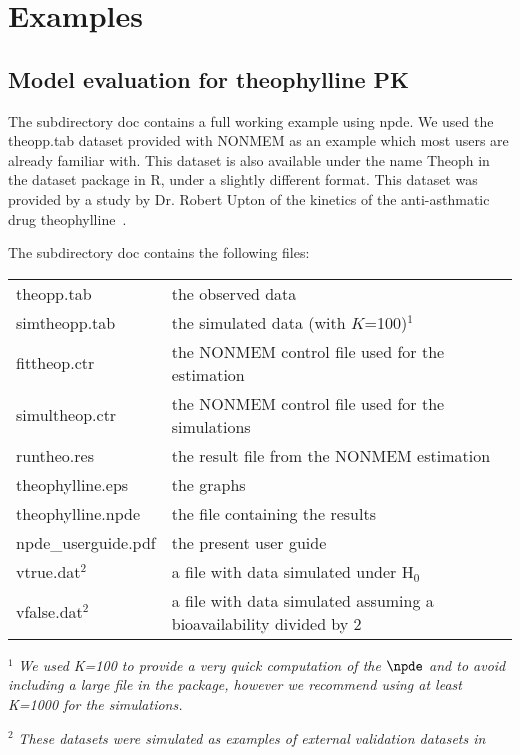 \section{Examples} \label{sec:npde.examples}

\subsection{Model evaluation for theophylline PK} \label{sec:exampletheo}

\hskip 18pt The subdirectory {\sf doc} contains a full working example using {\sf npde}. We used the {\sf theopp.tab} dataset provided with {\sf NONMEM} as an example which most users are already familiar with. This dataset is also available under the name {\sf Theoph} in the {\sf dataset} package in {\sf R}, under a slightly different format. This dataset was provided by a study by Dr. Robert Upton of the kinetics of the anti-asthmatic drug theophylline~\cite{NONMEM}.

The subdirectory {\sf doc} contains the following files:
\begin{center}
\begin{tabular} {l l}
\hline
theopp.tab & the observed data \\
simtheopp.tab & the simulated data (with $K$=100)$^1$ \\
fittheop.ctr & the NONMEM control file used for the estimation\\
simultheop.ctr & the NONMEM control file used for the simulations\\
runtheo.res & the result file from the NONMEM estimation \\
theophylline.eps & the graphs \\
theophylline.npde & the file containing the results \\
npde\_userguide.pdf & the present user guide \\
vtrue.dat$^2$ & a file with data simulated under H$_0$ \\
vfalse.dat$^2$ & a file with data simulated assuming a bioavailability divided by 2\\
\hline
\end{tabular}
\end{center}
\noindent$^1$ {\itshape We used K=100 to provide a very quick computation of the $\npde$ and to avoid including a large file in the package, however we recommend using at least K=1000 for the simulations.}

\noindent$^2$ {\itshape These datasets were simulated as examples of external validation datasets in~\cite{CometsCMPB08}}

